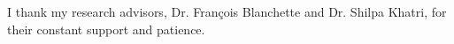 I thank my research advisors, Dr. François Blanchette and Dr. Shilpa Khatri, for their constant support and patience.